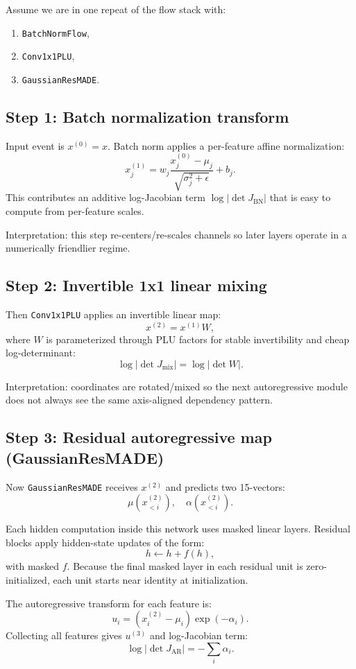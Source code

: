 \documentclass[11pt]{article}
\begin{document}
Assume we are in one repeat of the flow stack with:
\begin{enumerate}[leftmargin=*]
\item \texttt{BatchNormFlow},
\item \texttt{Conv1x1PLU},
\item \texttt{GaussianResMADE}.
\end{enumerate}

\subsection*{Step 1: Batch normalization transform}
Input event is $x^{(0)}=x$.
Batch norm applies a per-feature affine normalization:
\[
x^{(1)}_j = w_j\frac{x^{(0)}_j-\mu_j}{\sqrt{\sigma_j^2+\epsilon}} + b_j.
\]
This contributes an additive log-Jacobian term
$\log|\det J_{\text{BN}}|$ that is easy to compute from per-feature scales.

Interpretation: this step re-centers/re-scales channels so later layers operate
in a numerically friendlier regime.

\subsection*{Step 2: Invertible 1x1 linear mixing}
Then \texttt{Conv1x1PLU} applies an invertible linear map:
\[
x^{(2)} = x^{(1)}W,
\]
where $W$ is parameterized through PLU factors for stable invertibility and
cheap log-determinant:
\[
\log|\det J_{\text{mix}}| = \log|\det W|.
\]

Interpretation: coordinates are rotated/mixed so the next autoregressive module
does not always see the same axis-aligned dependency pattern.

\subsection*{Step 3: Residual autoregressive map (GaussianResMADE)}
Now \texttt{GaussianResMADE} receives $x^{(2)}$ and predicts two 15-vectors:
\[
\mu(x^{(2)}_{<i}),\quad \alpha(x^{(2)}_{<i}).
\]

Each hidden computation inside this network uses masked linear layers. Residual
blocks apply hidden-state updates of the form:
\[
h \leftarrow h + f(h),
\]
with masked $f$. Because the final masked layer in each residual unit is
zero-initialized, each unit starts near identity at initialization.

The autoregressive transform for each feature is:
\[
u_i = (x^{(2)}_i - \mu_i)\exp(-\alpha_i).
\]
Collecting all features gives $u^{(3)}$ and log-Jacobian term:
\[
\log|\det J_{\text{AR}}| = -\sum_i \alpha_i.
\]
\end{document}
